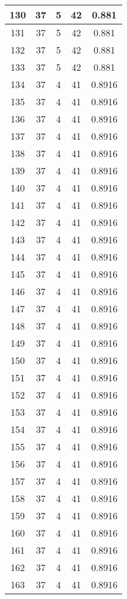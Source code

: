 \documentclass[letterpaper, 12pt]{article}
\begin{document}
\begin{longtable}{|c|c|c|c|c|}
130 & 37 & 5 & 42 & 0.881 \\
\hline
131 & 37 & 5 & 42 & 0.881 \\
\hline
132 & 37 & 5 & 42 & 0.881 \\
\hline
133 & 37 & 5 & 42 & 0.881 \\
\hline
134 & 37 & 4 & 41 & 0.8916 \\
\hline
135 & 37 & 4 & 41 & 0.8916 \\
\hline
136 & 37 & 4 & 41 & 0.8916 \\
\hline
137 & 37 & 4 & 41 & 0.8916 \\
\hline
138 & 37 & 4 & 41 & 0.8916 \\
\hline
139 & 37 & 4 & 41 & 0.8916 \\
\hline
140 & 37 & 4 & 41 & 0.8916 \\
\hline
141 & 37 & 4 & 41 & 0.8916 \\
\hline
142 & 37 & 4 & 41 & 0.8916 \\
\hline
143 & 37 & 4 & 41 & 0.8916 \\
\hline
144 & 37 & 4 & 41 & 0.8916 \\
\hline
145 & 37 & 4 & 41 & 0.8916 \\
\hline
146 & 37 & 4 & 41 & 0.8916 \\
\hline
147 & 37 & 4 & 41 & 0.8916 \\
\hline
148 & 37 & 4 & 41 & 0.8916 \\
\hline
149 & 37 & 4 & 41 & 0.8916 \\
\hline
150 & 37 & 4 & 41 & 0.8916 \\
\hline
151 & 37 & 4 & 41 & 0.8916 \\
\hline
152 & 37 & 4 & 41 & 0.8916 \\
\hline
153 & 37 & 4 & 41 & 0.8916 \\
\hline
154 & 37 & 4 & 41 & 0.8916 \\
\hline
155 & 37 & 4 & 41 & 0.8916 \\
\hline
156 & 37 & 4 & 41 & 0.8916 \\
\hline
157 & 37 & 4 & 41 & 0.8916 \\
\hline
158 & 37 & 4 & 41 & 0.8916 \\
\hline
159 & 37 & 4 & 41 & 0.8916 \\
\hline
160 & 37 & 4 & 41 & 0.8916 \\
\hline
161 & 37 & 4 & 41 & 0.8916 \\
\hline
162 & 37 & 4 & 41 & 0.8916 \\
\hline
163 & 37 & 4 & 41 & 0.8916 \\

\end{longtable}
\end{document}

